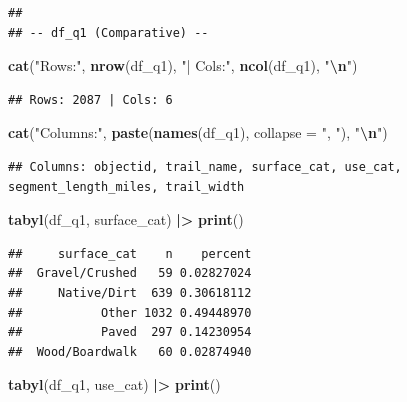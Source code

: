 \documentclass[
]{article}
\newenvironment{Shaded}{\begin{snugshade}}{\end{snugshade}}
\newcommand{\AttributeTok}[1]{\textcolor[rgb]{0.13,0.29,0.53}{#1}}
\newcommand{\FunctionTok}[1]{\textcolor[rgb]{0.13,0.29,0.53}{\textbf{#1}}}
\newcommand{\NormalTok}[1]{#1}
\newcommand{\SpecialCharTok}[1]{\textcolor[rgb]{0.81,0.36,0.00}{\textbf{#1}}}
\newcommand{\StringTok}[1]{\textcolor[rgb]{0.31,0.60,0.02}{#1}}
\begin{document}
\begin{verbatim}
## 
## -- df_q1 (Comparative) --
\end{verbatim}

\begin{Shaded}
\begin{Highlighting}[]
\FunctionTok{cat}\NormalTok{(}\StringTok{"Rows:"}\NormalTok{, }\FunctionTok{nrow}\NormalTok{(df\_q1), }\StringTok{"| Cols:"}\NormalTok{, }\FunctionTok{ncol}\NormalTok{(df\_q1), }\StringTok{"}\SpecialCharTok{\textbackslash{}n}\StringTok{"}\NormalTok{)}
\end{Highlighting}
\end{Shaded}

\begin{verbatim}
## Rows: 2087 | Cols: 6
\end{verbatim}

\begin{Shaded}
\begin{Highlighting}[]
\FunctionTok{cat}\NormalTok{(}\StringTok{"Columns:"}\NormalTok{, }\FunctionTok{paste}\NormalTok{(}\FunctionTok{names}\NormalTok{(df\_q1), }\AttributeTok{collapse =} \StringTok{", "}\NormalTok{), }\StringTok{"}\SpecialCharTok{\textbackslash{}n}\StringTok{"}\NormalTok{)}
\end{Highlighting}
\end{Shaded}

\begin{verbatim}
## Columns: objectid, trail_name, surface_cat, use_cat, segment_length_miles, trail_width
\end{verbatim}

\begin{Shaded}
\begin{Highlighting}[]
\FunctionTok{tabyl}\NormalTok{(df\_q1, surface\_cat) }\SpecialCharTok{|\textgreater{}} \FunctionTok{print}\NormalTok{()}
\end{Highlighting}
\end{Shaded}

\begin{verbatim}
##     surface_cat    n    percent
##  Gravel/Crushed   59 0.02827024
##     Native/Dirt  639 0.30618112
##           Other 1032 0.49448970
##           Paved  297 0.14230954
##  Wood/Boardwalk   60 0.02874940
\end{verbatim}

\begin{Shaded}
\begin{Highlighting}[]
\FunctionTok{tabyl}\NormalTok{(df\_q1, use\_cat)     }\SpecialCharTok{|\textgreater{}} \FunctionTok{print}\NormalTok{()}
\end{Highlighting}
\end{Shaded}
\end{document}
